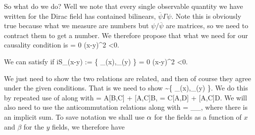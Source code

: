 So what do we do? Well we note that every single observable quantity we have written for the Dirac field has contained bilinears, $\overline{\psi}\Gamma\psi$. Note this is obviously true because what we measure are numbers but $\psi/\overline{\psi}$ are matrices, so we need to contract them to get a number. We therefore propose that what we need for our causality condition is 
\be 
\label{eqn:CommutatorBilinears}
     = 0 \qquad \forall (x-y)^2 <0.
\ee 

\bcl 
    We can satisfy  if
    \be 
    \label{eqn:AnticommutatorPsiPsiBar}
        iS_{\a\beta}(x-y) := \big\{ \psi_{\a}(x),\overline{\psi}_{\beta}(y) \big\} = 0 \qquad \forall (x-y)^2 <0. 
    \ee 
\ecl 

\bq 
    We just need to show the two relations are related, and then of course they agree under the given conditions. That is we need to show 
    \bse 
         \sim  \big\{ \psi_{\a}(x),\overline{\psi}_{\beta}(y) \big\}.
    \ese 
    We do this by repeated use of  along with 
    \bse 
        [AB,C] = A[B,C] + [A,C]B, \qand [A,CD] = C[A,D] + [A,C]D.
    \ese 
    We will also need to use the anticommutation relations  along with 
    \bse 
        \overline{\psi}\psi = \overline{\psi}_{\a}\psi_{\a},
    \ese 
    where there is an implicit sum. To save notation we shall use $\alpha$ for the fields as a function of $x$ and $\beta$ for the $y$ fields, we therefore have 
    \bse 
